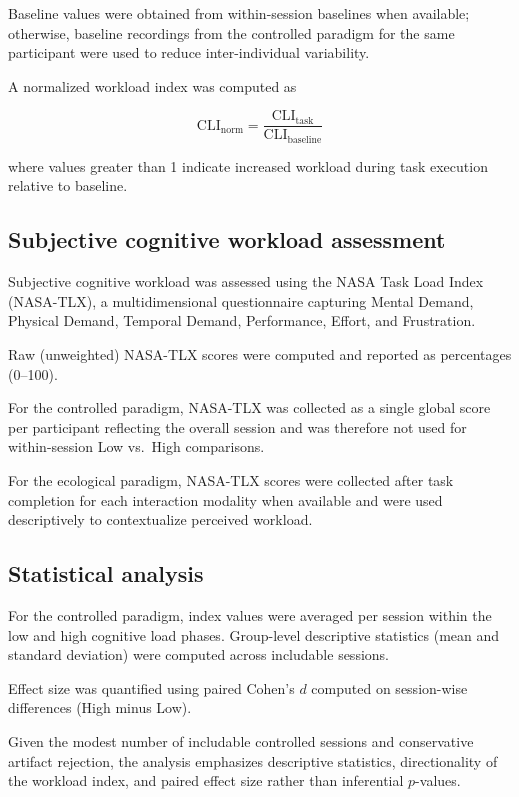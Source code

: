 \documentclass[10pt]{iopart}
\begin{document}
Baseline values were obtained from within-session baselines when available; otherwise, baseline recordings from the controlled paradigm for the same participant were used to reduce inter-individual variability.

A normalized workload index was computed as

\begin{equation}
\mathrm{CLI}_{\mathrm{norm}} =
\frac{\mathrm{CLI}_{\mathrm{task}}}{\mathrm{CLI}_{\mathrm{baseline}}}
\label{eq:cli_norm}
\end{equation}

where values greater than 1 indicate increased workload during task execution relative to baseline.

\subsection{Subjective cognitive workload assessment}

Subjective cognitive workload was assessed using the NASA Task Load Index (NASA-TLX), a multidimensional questionnaire capturing Mental Demand, Physical Demand, Temporal Demand, Performance, Effort, and Frustration.

Raw (unweighted) NASA-TLX scores were computed and reported as percentages (0--100).

For the controlled paradigm, NASA-TLX was collected as a single global score per participant reflecting the overall session and was therefore not used for within-session Low vs.\ High comparisons.

For the ecological paradigm, NASA-TLX scores were collected after task completion for each interaction modality when available and were used descriptively to contextualize perceived workload.

\subsection{Statistical analysis}

For the controlled paradigm, index values were averaged per session within the low and high cognitive load phases. Group-level descriptive statistics (mean and standard deviation) were computed across includable sessions.

Effect size was quantified using paired Cohen’s $d$ computed on session-wise differences (High minus Low).

Given the modest number of includable controlled sessions and conservative artifact rejection, the analysis emphasizes descriptive statistics, directionality of the workload index, and paired effect size rather than inferential $p$-values.
\end{document}
